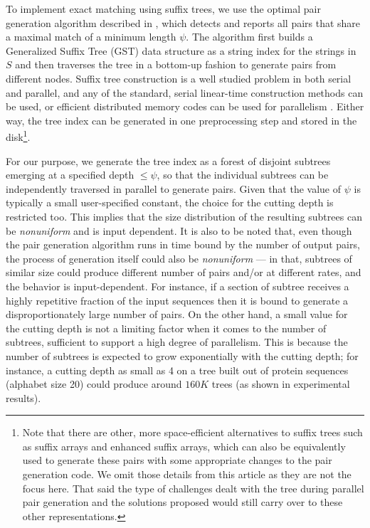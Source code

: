 \documentclass[10pt,journal,letterpaper,compsoc]{IEEEtran}
\begin{document}
To implement exact matching using suffix trees, we use the optimal pair generation algorithm described in \cite{KalyanaramanJPDC07}, which detects and reports all pairs that share a maximal match of a minimum length $\psi$. The algorithm first builds a Generalized Suffix Tree (GST) data structure \cite{Weiner73} as a string index for the strings in $S$ and then traverses the tree in a bottom-up fashion to generate pairs from different nodes. Suffix tree construction is a well studied problem in both serial and parallel, and any of the standard, serial linear-time construction methods \cite{McCreight76,Ukkonen90,Weiner73} can be used, or efficient distributed memory codes can be used for parallelism \cite{Ghoting09,KalyanaramanJPDC07}.  Either way, the tree index can be generated in one preprocessing step and stored in the disk\footnote{Note that there are other, more space-efficient alternatives to suffix trees such as suffix arrays and enhanced suffix arrays, which can also be equivalently used to generate these pairs with some appropriate changes to the pair generation code. We omit those details from this article as they are not the focus here. That said the type of challenges dealt with the tree during parallel pair generation and the solutions proposed would still carry over to these other representations.}. 

For our purpose, we generate the tree index as a forest of disjoint subtrees emerging at a specified depth $\leq\psi$, so that the individual subtrees can be independently traversed in parallel to generate pairs. Given that the value of $\psi$ is typically a small user-specified constant, the choice for the cutting depth is restricted too. This implies that the size distribution of the resulting subtrees can be \emph{nonuniform} and is input dependent. It is also to be noted that, even though the pair generation algorithm runs in time bound by the number of output pairs, the process of generation itself could also be \emph{nonuniform} --- in that, subtrees of similar size could produce different number of pairs and/or at different rates, and the behavior is input-dependent. For instance, if a section of subtree receives a highly repetitive fraction of the input sequences then it is bound to generate a disproportionately large number of pairs.  On the other hand, a small value for the cutting depth is not a limiting factor when it comes to the number of subtrees, sufficient to support a high degree of parallelism. This is because the number of subtrees is expected to grow exponentially with the cutting depth; for instance, a cutting depth as small as 4 on a tree built out of protein sequences (alphabet size 20) could produce around $160K$ trees (as shown in experimental results). 
\end{document}
